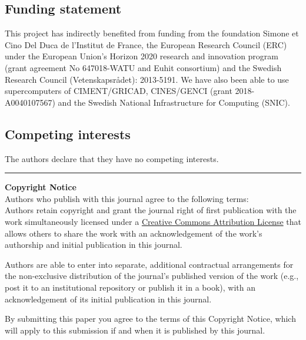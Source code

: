 \subsection{Funding statement}


This project has indirectly benefited from funding from the foundation Simone et
Cino Del Duca de l'Institut de France, the European Research Council (ERC)
under the European Union's Horizon 2020 research and innovation program (grant
agreement No 647018-WATU and Euhit consortium) and the Swedish Research Council
(Vetenskapsr{\aa}det): 2013-5191.
%
We have also been able to use supercomputers of CIMENT/GRICAD, CINES/GENCI
(grant 2018-A0040107567) and the Swedish National Infrastructure for Computing
(SNIC).

\subsection{Competing interests}

The authors declare that they have no competing interests.


%


\rule{\textwidth}{1pt}

{\bf Copyright Notice} \\
Authors who publish with this journal agree to the following terms: \\

Authors retain copyright and grant the journal right of first publication with
the work simultaneously licensed under a
\href{http://creativecommons.org/licenses/by/3.0/}{Creative Commons Attribution
License} that allows others to share the work with an acknowledgement of the
work's authorship and initial publication in this journal.

Authors are able to enter into separate, additional contractual arrangements
for the non-exclusive distribution of the journal's published version of the
work (e.g., post it to an institutional repository or publish it in a book),
with an acknowledgement of its initial publication in this journal.

By submitting this paper you agree to the terms of this Copyright Notice, which
will apply to this submission if and when it is published by this journal.

